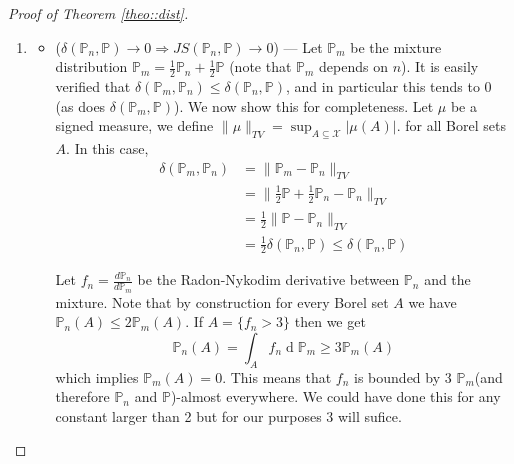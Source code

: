 \documentclass{article} %
\newcommand\PP{\mathbb{P}}
\renewcommand{\d}[1]{\ensuremath{\operatorname{d}\!{#1}}}
\theoremstyle{definition}
\theoremstyle{definition}
\begin{document}
\begin{appendices}
\begin{proof}[Proof of Theorem \ref{theo::dist}] \mbox{~}\par
  \begin{enumerate}
    \item
      \begin{itemize}
      \item ($\delta(\PP_n, \PP) \to 0 \Rightarrow JS(\PP_n,\PP) \to 0$) \quad --- \quad
        Let $\PP_m$ be the mixture distribution $\PP_m = \frac{1}{2} \PP_n
        + \frac{1}{2} \PP$ (note that $\PP_m$ depends on $n$).
        It is easily verified that $\delta(\PP_m, \PP_n)
        \leq \delta(\PP_n, \PP)$, and in particular this tends to 0 (as
        does $\delta(\PP_m, \PP)$). We now show this for completeness.
        Let $\mu$ be a signed measure,
        we define $\|\mu\|_{TV} = \sup_{A \subseteq \mathcal{X}} |\mu(A)|$.
        for all Borel sets $A$.
        In this case,
        \begin{align*}
          \delta(\PP_m, \PP_n) &= \| \PP_m - \PP_n \|_{TV} \\
          &= \| \frac{1}{2} \PP + \frac{1}{2} \PP_n - \PP_n \|_{TV} \\
          &= \frac{1}{2} \| \PP - \PP_n \|_{TV} \\
          &= \frac{1}{2} \delta(\PP_n, \PP) \leq \delta(\PP_n, \PP)
        \end{align*}
        
        Let $f_n = \frac{d \PP_n}{d \PP_m}$ be the Radon-Nykodim
        derivative between $\PP_n$ and the mixture. Note that by
        construction for every Borel set $A$ we have $\PP_n(A) \leq 
        2 \PP_m(A)$. If $A = \{f_n > 3\}$ then we get
        $$ \PP_n(A) = \int_A f_n \d \PP_m \geq 3 \PP_m(A)$$
        which implies $\PP_m(A) = 0$. This means that $f_n$
        is bounded by 3 $\PP_m$(and therefore $\PP_n$ and
        $\PP$)-almost everywhere. We could have done this
        for any constant larger than 2 but for our
        purposes 3 will sufice.
        

\end{itemize}
\end{enumerate}
\end{proof}
\end{appendices}
\end{document}
